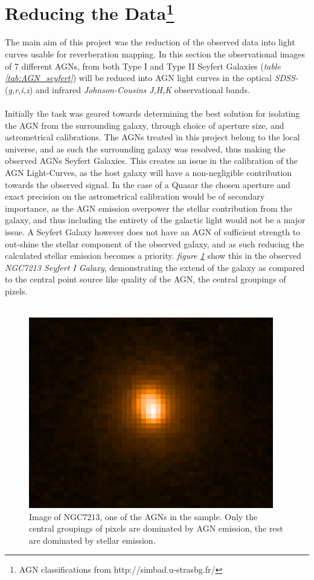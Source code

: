 \documentclass[a4paper, 12pt, twoside]{article}
\begin{document}
\section[Reducing the Data]{Reducing the Data\footnote{AGN classifications from http://simbad.u-strasbg.fr/\cite{simbad}}}
The main aim of this project was the reduction of the observed data into light curves usable for reverberation mapping. In this section the observational images of 7 different AGNs, from both Type I and Type II Seyfert Galaxies (\emph{table \ref{tab:AGN_seyfert}}) will be reduced into AGN light curves in the optical \emph{SDSS-} (\emph{g,r,i,z}) and infrared \emph{Johnson-Cousins} \emph{J,H,K} observational bands. \\
\\
Initially the task was geared towards determining the best solution for isolating the AGN from the surrounding galaxy, through choice of aperture size, and astrometrical calibrations. The AGNs treated in this project belong to the local universe, and as such the surrounding galaxy was resolved, thus making the observed AGNs Seyfert Galaxies. This creates an issue in the calibration of the AGN Light-Curves, as the host galaxy will have a non-negligible contribution towards the observed signal. In the case of a Quasar the chosen aperture and exact precision on the astrometrical calibration would be of secondary importance, as the AGN emission overpower the stellar contribution from the galaxy, and thus including the entirety of the galactic light would not be a major issue. A Seyfert Galaxy however does not have an AGN of sufficient strength to out-shine the stellar component of the observed galaxy, and as such reducing the calculated stellar emission becomes a priority. \emph{figure \ref{fig:NGC7213}} show this in the observed \emph{NGC7213 Seyfert I Galaxy}, demonstrating the extend of the galaxy as compared to the central point source like quality of the AGN, the central groupings of pizels.\\
\\
\begin{figure}[t!]
\centering
\includegraphics[width=0.8\linewidth]{Figure/NGC7213.png}
\caption{Image of NGC7213, one of the AGNs in the sample. Only the central groupings of pixels are dominated by AGN emission, the rest are dominated by stellar emission.}
\label{fig:NGC7213}
\end{figure}
\end{document}
